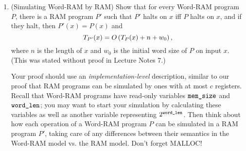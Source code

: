 \documentclass[11pt]{article}
\begin{document}
\begin{enumerate}
\begin{enumerate}
    \item (optional\footnote{This problem won't make a difference between N, L, R-, and R grades.}) Give a theoretical explanation (using asymptotic estimates) of the shapes of the runtime curves you see in Part~\ref{itm:realtime}. You may need to do some research online and/or make guesses about how Python operations are implemented to come up with your estimates. 
\end{enumerate}

\item (Simulating Word-RAM by RAM)  Show that for every Word-RAM program $P$, there is a RAM program $P'$ such that $P'$ halts on $x$ iff $P$ halts on $x$, and if they halt, then  $P'(x)=P(x)$ and 
       $$T_{P'}(x) = O\left(T_P(x)+n+w_0\right),$$
where $n$ is the length of $x$ and $w_0$ is the initial word size of $P$ on input $x$.  (This was stated without proof in Lecture Notes 7.) 

Your proof should use an {\em implementation-level} description, similar to our proof that RAM programs can be simulated by ones with at most $c$ registers.  Recall that Word-RAM programs have read-only variables $\texttt{mem\_size}$ and $\texttt{word\_len}$; you may want to start your simulation by calculating these variables as well as another variable representing $2^{\texttt{word\_len}}$.  Then think about how each operation of a Word-RAM program $P$ can be simulated in a RAM program $P'$, taking care of any differences between their semantics in the Word-RAM model vs. the RAM model. Don't forget MALLOC!



\end{enumerate}
\end{document}
